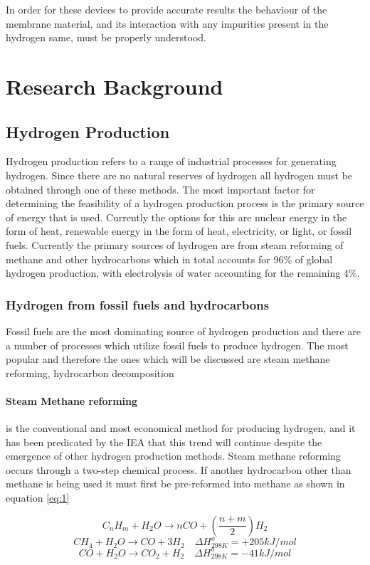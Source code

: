 In order for these devices to provide accurate results the behaviour of the membrane material, and its interaction with any impurities present in the hydrogen same, must be properly understood.  


\section{Research Background}
\subsection{Hydrogen Production}
Hydrogen production refers to a range of industrial processes for generating hydrogen. Since there are no natural reserves of hydrogen all hydrogen must be obtained through one of these methods. The most important factor for determining the feasibility of a hydrogen production process is the primary source of energy that is used. Currently the options for this are nuclear energy in the form of heat, renewable energy in the form of heat, electricity, or light, or fossil fuels. Currently the primary sources of hydrogen are from steam reforming of methane and other hydrocarbons which in total accounts for 96\% of global hydrogen production, with electrolysis of water accounting for the remaining 4\%.
\subsubsection{Hydrogen from fossil fuels and hydrocarbons}
Fossil fuels are the most dominating source of hydrogen production and there are a number of processes which utilize fossil fuels to produce hydrogen. The most popular and therefore the ones which will be discussed are steam methane reforming, hydrocarbon decomposition
\paragraph{Steam Methane reforming}
is the conventional and most economical method for producing hydrogen, and it has been predicated by the IEA that this trend will continue despite the emergence of other hydrogen production methods. Steam methane reforming occurs through a two-step chemical process. If another hydrocarbon other than methane is being used it must first be pre-reformed into methane as shown in equation \ref{eq:1}

\begin{equation} \label{eq:1}
    C_n H_m + H_2 O \rightarrow nCO +(\frac{n+m}{2})H_2 
\end{equation}
\begin{equation}\label{eq:2}
    CH_4 + H_2 O \rightarrow CO + 3H_2 \quad \Delta H_{298K}^o = +205 kJ/mol
\end{equation}
\begin{equation}\label{eq:3}
    CO+ H_2 O \rightarrow CO_2 + H_2 \quad \Delta H_{298K}^o = -41 kJ/mol
\end{equation}

